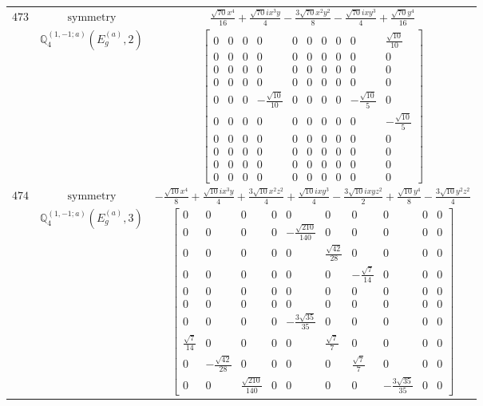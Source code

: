 \documentclass[fleqn,8pt,landscape]{jsarticle}
\begin{document}
\begin{longtable}{ccc}
$ 473 $ & $ \text{symmetry} $ & $ \frac{\sqrt{70} x^{4}}{16} + \frac{\sqrt{70} i x^{3} y}{4} - \frac{3 \sqrt{70} x^{2} y^{2}}{8} - \frac{\sqrt{70} i x y^{3}}{4} + \frac{\sqrt{70} y^{4}}{16} $ \\
$  $ & $ \mathbb{Q}_{4}^{(1,-1;a)}(E_{g}^{(a)},2) $ & $ \begin{bmatrix} 0 & 0 & 0 & 0 & 0 & 0 & 0 & 0 & 0 & \frac{\sqrt{10}}{10} \\ 0 & 0 & 0 & 0 & 0 & 0 & 0 & 0 & 0 & 0 \\ 0 & 0 & 0 & 0 & 0 & 0 & 0 & 0 & 0 & 0 \\ 0 & 0 & 0 & 0 & 0 & 0 & 0 & 0 & 0 & 0 \\ 0 & 0 & 0 & - \frac{\sqrt{10}}{10} & 0 & 0 & 0 & 0 & - \frac{\sqrt{10}}{5} & 0 \\ 0 & 0 & 0 & 0 & 0 & 0 & 0 & 0 & 0 & - \frac{\sqrt{10}}{5} \\ 0 & 0 & 0 & 0 & 0 & 0 & 0 & 0 & 0 & 0 \\ 0 & 0 & 0 & 0 & 0 & 0 & 0 & 0 & 0 & 0 \\ 0 & 0 & 0 & 0 & 0 & 0 & 0 & 0 & 0 & 0 \\ 0 & 0 & 0 & 0 & 0 & 0 & 0 & 0 & 0 & 0 \end{bmatrix} $ \\ \hline
$ 474 $ & $ \text{symmetry} $ & $ - \frac{\sqrt{10} x^{4}}{8} + \frac{\sqrt{10} i x^{3} y}{4} + \frac{3 \sqrt{10} x^{2} z^{2}}{4} + \frac{\sqrt{10} i x y^{3}}{4} - \frac{3 \sqrt{10} i x y z^{2}}{2} + \frac{\sqrt{10} y^{4}}{8} - \frac{3 \sqrt{10} y^{2} z^{2}}{4} $ \\
$  $ & $ \mathbb{Q}_{4}^{(1,-1;a)}(E_{g}^{(a)},3) $ & $ \begin{bmatrix} 0 & 0 & 0 & 0 & 0 & 0 & 0 & 0 & 0 & 0 \\ 0 & 0 & 0 & 0 & - \frac{\sqrt{210}}{140} & 0 & 0 & 0 & 0 & 0 \\ 0 & 0 & 0 & 0 & 0 & \frac{\sqrt{42}}{28} & 0 & 0 & 0 & 0 \\ 0 & 0 & 0 & 0 & 0 & 0 & - \frac{\sqrt{7}}{14} & 0 & 0 & 0 \\ 0 & 0 & 0 & 0 & 0 & 0 & 0 & 0 & 0 & 0 \\ 0 & 0 & 0 & 0 & 0 & 0 & 0 & 0 & 0 & 0 \\ 0 & 0 & 0 & 0 & - \frac{3 \sqrt{35}}{35} & 0 & 0 & 0 & 0 & 0 \\ \frac{\sqrt{7}}{14} & 0 & 0 & 0 & 0 & \frac{\sqrt{7}}{7} & 0 & 0 & 0 & 0 \\ 0 & - \frac{\sqrt{42}}{28} & 0 & 0 & 0 & 0 & \frac{\sqrt{7}}{7} & 0 & 0 & 0 \\ 0 & 0 & \frac{\sqrt{210}}{140} & 0 & 0 & 0 & 0 & - \frac{3 \sqrt{35}}{35} & 0 & 0 \end{bmatrix} $ \\ \hline

\end{longtable}
\end{document}
